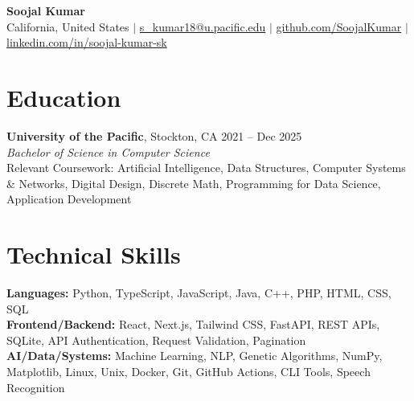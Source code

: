 \documentclass[letterpaper,10.5pt]{article}
\begin{document}
\begin{center}
  {\LARGE \textbf{Soojal Kumar}} \\[-1pt]
  California, United States $|$
  \href{mailto:s_kumar18@u.pacific.edu}{s\_kumar18@u.pacific.edu} $|$
  \href{https://github.com/SoojalKumar}{github.com/SoojalKumar} $|$
  \href{https://linkedin.com/in/soojal-kumar-sk}{linkedin.com/in/soojal-kumar-sk}
\end{center}

\section{Education}
\textbf{University of the Pacific}, Stockton, CA \hfill 2021 -- Dec 2025 \\
\textit{Bachelor of Science in Computer Science} \\
Relevant Coursework: Artificial Intelligence, Data Structures, Computer Systems \& Networks, Digital Design, Discrete Math, Programming for Data Science, Application Development

\section{Technical Skills}
\textbf{Languages:} Python, TypeScript, JavaScript, Java, C++, PHP, HTML, CSS, SQL \\
\textbf{Frontend/Backend:} React, Next.js, Tailwind CSS, FastAPI, REST APIs, SQLite, API Authentication, Request Validation, Pagination \\
\textbf{AI/Data/Systems:} Machine Learning, NLP, Genetic Algorithms, NumPy, Matplotlib, Linux, Unix, Docker, Git, GitHub Actions, CLI Tools, Speech Recognition

\end{document}
